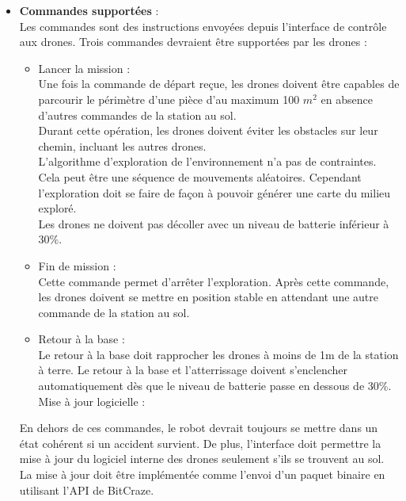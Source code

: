 \documentclass{mistcoursedoc}
\begin{document}
\begin{itemize}
  \item \textbf{Commandes supportées} :\\
        Les commandes sont des instructions envoyées depuis l'interface de contrôle
        aux drones. Trois commandes devraient être supportées par les drones :
        \begin{itemize}
          \item Lancer la mission : \\
                Une fois la commande de départ reçue, les drones doivent être capables de parcourir le périmètre
                d’une pièce d’au maximum 100 $m^2$ en absence d’autres commandes de la station au sol. \\
                Durant cette opération, les drones doivent éviter les obstacles sur leur chemin, incluant les autres drones.\\
                L’algorithme d’exploration de l’environnement n’a pas de contraintes.
                Cela peut être une séquence de mouvements aléatoires. Cependant l'exploration doit se faire
                de façon à pouvoir générer une carte du milieu exploré.\\
                Les drones ne doivent pas décoller avec un niveau de batterie inférieur à 30\%.
          \item Fin de mission : \\
                Cette commande permet d'arrêter l'exploration. Après cette commande, les drones doivent se mettre en position stable en attendant une autre commande de la station au sol.
          \item Retour à la base : \\
                Le retour à la base doit rapprocher les drones à moins de 1m de la station à terre.
                Le retour à la base et l’atterrissage doivent s’enclencher automatiquement dès que le niveau
                de batterie passe en dessous de 30\%.
                Mise à jour logicielle : \\
        \end{itemize}
        \par
        En dehors de ces commandes, le robot devrait toujours se mettre dans un état cohérent si un accident survient.
        De plus, l’interface doit permettre la mise à jour du logiciel interne des drones seulement s’ils se trouvent au sol. La mise à jour doit être implémentée comme l’envoi d’un paquet binaire en utilisant l’API de BitCraze.
        

\end{itemize}
\end{document}
